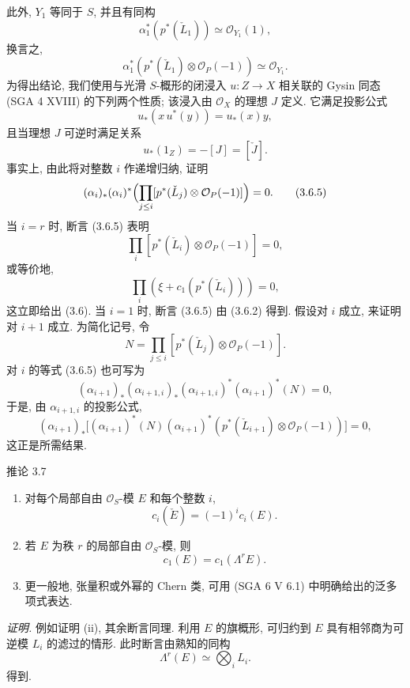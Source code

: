此外, $Y_1$ 等同于 $S$, 并且有同构
\[
\alpha_1^*(p^*(\check L_1))\simeq\mathcal O_{Y_1}(1),
\]
换言之,
\[
\alpha_1^*(p^*(\check L_1)\otimes\mathcal O_P(-1))\simeq \mathcal O_{Y_1}.
\tag{3.6.2}
\]
为得出结论, 我们使用与光滑 $S$-概形的闭浸入 $u:Z\to X$ 相关联的 Gysin 同态 (SGA 4 XVIII) 的下列两个性质; 该浸入由 $\mathcal O_X$ 的理想 $J$ 定义. 它满足投影公式
\[
u_*(x\,u^*(y))=u_*(x)y,
\tag{3.6.3}
\]
且当理想 $J$ 可逆时满足关系
\[
u_*(1_Z)=-[J]=[\check J].
\tag{3.6.4}
\]
事实上, 由此将对整数 $i$ 作递增归纳, 证明
\[
(\alpha_i)_*(\alpha_i)^*\Bigl(\prod_{j\le i}[p^*(\check L_j)\otimes\mathcal O_P(-1)]\Bigr)=0.
\tag{3.6.5}
\]
当 $i=r$ 时, 断言 (3.6.5) 表明
\[
\prod_i[p^*(\check L_i)\otimes\mathcal O_P(-1)]=0,
\]
或等价地,
\[
\prod_i(\xi+c_1(p^*(\check L_i)))=0,
\]
这立即给出 (3.6). 当 $i=1$ 时, 断言 (3.6.5) 由 (3.6.2) 得到. 假设对 $i$ 成立, 来证明对 $i+1$ 成立. 为简化记号, 令
\[
N=\prod_{j\le i}[p^*(\check L_j)\otimes\mathcal O_P(-1)].
\]
对 $i$ 的等式 (3.6.5) 也可写为
\[
(\alpha_{i+1})_*(\alpha_{i+1,i})_*(\alpha_{i+1,i})^*(\alpha_{i+1})^*(N)=0,
\]
于是, 由 $\alpha_{i+1,i}$ 的投影公式,
\[
(\alpha_{i+1})_*\bigl[(\alpha_{i+1})^*(N)(\alpha_{i+1})^*(p^*(\check L_{i+1})\otimes\mathcal O_P(-1))\bigr]=0,
\]
这正是所需结果.

\begin{statement}{推论 3.7}
\begin{enumerate}[label=(\roman*)]
\item 对每个局部自由 $\mathcal O_S$-模 $E$ 和每个整数 $i$,
\[
c_i(\check E)=(-1)^i c_i(E).
\]
\item 若 $E$ 为秩 $r$ 的局部自由 $\mathcal O_S$-模, 则
\[
c_1(E)=c_1(\Lambda^rE).
\]
\item 更一般地, 张量积或外幂的 Chern 类, 可用 (SGA 6 V 6.1) 中明确给出的泛多项式表达.
\end{enumerate}
\end{statement}

\emph{证明.} 例如证明 (ii), 其余断言同理. 利用 $E$ 的旗概形, 可归约到 $E$ 具有相邻商为可逆模 $L_i$ 的滤过的情形. 此时断言由熟知的同构
\[
\Lambda^r(E)\simeq\bigotimes_i L_i.
\]
得到.
